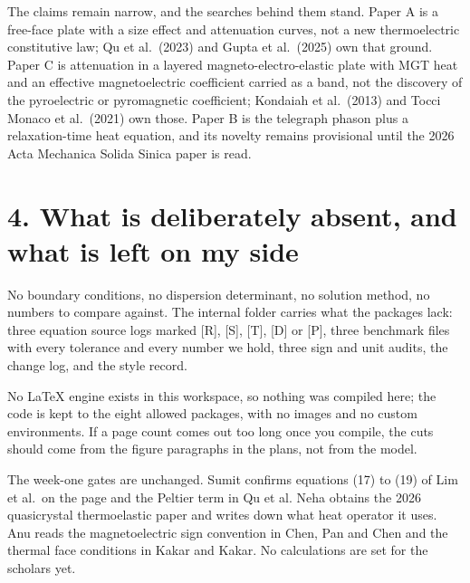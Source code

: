 \documentclass[11pt]{article}
\begin{document}
The claims remain narrow, and the searches behind them stand. Paper A is a free-face plate with a size effect
and attenuation curves, not a new thermoelectric constitutive law; Qu et al.\ (2023) and Gupta et al.\ (2025)
own that ground. Paper C is attenuation in a layered magneto-electro-elastic plate with MGT heat and an
effective magnetoelectric coefficient carried as a band, not the discovery of the pyroelectric or
pyromagnetic coefficient; Kondaiah et al.\ (2013) and Tocci Monaco et al.\ (2021) own those. Paper B is the
telegraph phason plus a relaxation-time heat equation, and its novelty remains provisional until the 2026
Acta Mechanica Solida Sinica paper is read.

\section*{4. What is deliberately absent, and what is left on my side}

No boundary conditions, no dispersion determinant, no solution method, no numbers to compare against. The
internal folder carries what the packages lack: three equation source logs marked [R], [S], [T], [D] or [P],
three benchmark files with every tolerance and every number we hold, three sign and unit audits, the change
log, and the style record.

No LaTeX engine exists in this workspace, so nothing was compiled here; the code is kept to the eight allowed
packages, with no images and no custom environments. If a page count comes out too long once you compile, the
cuts should come from the figure paragraphs in the plans, not from the model.

The week-one gates are unchanged. Sumit confirms equations (17) to (19) of Lim et al.\ on the page and the
Peltier term in Qu et al. Neha obtains the 2026 quasicrystal thermoelastic paper and writes down what heat
operator it uses. Anu reads the magnetoelectric sign convention in Chen, Pan and Chen and the thermal face
conditions in Kakar and Kakar. No calculations are set for the scholars yet.
\end{document}
